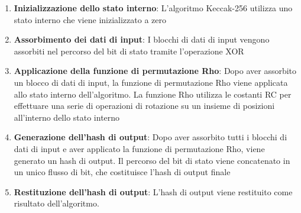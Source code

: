 \documentclass[a4paper,11pt]{report}
\begin{document}
\begin{enumerate}
    \item \textbf{Inizializzazione dello stato interno}: L'algoritmo Keccak-256 utilizza uno stato interno che viene inizializzato a zero
    \item \textbf{Assorbimento dei dati di input}: I blocchi di dati di input vengono assorbiti nel percorso del bit di stato tramite l'operazione XOR
    \item \textbf{Applicazione della funzione di permutazione Rho}: Dopo aver assorbito un blocco di dati di input, la funzione di permutazione Rho viene applicata allo stato interno dell'algoritmo. La funzione Rho utilizza le costanti RC per effettuare una serie di operazioni di rotazione su un insieme di posizioni all'interno dello stato interno
    \item \textbf{Generazione dell'hash di output}: Dopo aver assorbito tutti i blocchi di dati di input e aver applicato la funzione di permutazione Rho, viene generato un hash di output. Il percorso del bit di stato viene concatenato in un unico flusso di bit, che costituisce l'hash di output finale
    \item \textbf{Restituzione dell'hash di output}: L'hash di output viene restituito come risultato dell'algoritmo.
\end{enumerate}
\end{document}
